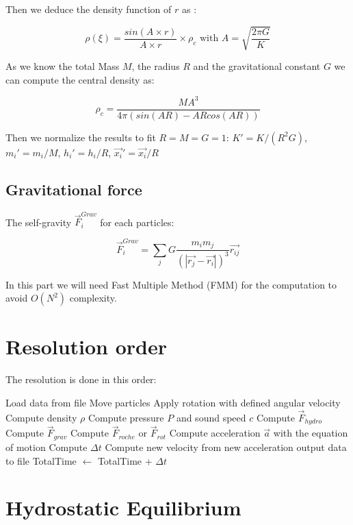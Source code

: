 \documentclass{article}
\begin{document}
Then we deduce the density function of $r$ as :

$$\rho(\xi) = \frac{sin(A\times r)}{A \times r} \times \rho_c \mbox{ with } A = \sqrt{\frac{2\pi G}{K}}
$$

As we know the total Mass $M$, the radius $R$ and the gravitational constant $G$ we can compute the central density as:

$$ \rho_c = \frac{M A^3}{4 \pi (sin(AR)-ARcos(AR)) } $$

Then we normalize the results to fit $R = M = G = 1$: $K' = K/(R^2G) $, $m_i' = m_i/M $, $h_i' = h_i / R$, $\vec{x_i}' = \vec{x_i}/R$


\subsection{Gravitational force}

The self-gravity $\vec{F}_i^{Grav}$ for each particles:

\begin{equation}
\vec{F}_i^{Grav} = \sum_j G\frac{m_im_j}{(|\vec{r_j}-\vec{r_i}|)^3} \vec{r_{ij}}
\end{equation}

In this part we will need Fast Multiple Method (FMM) for the computation to avoid $O(N^2)$ complexity.

\section{Resolution order}
\label{sec:reso}

The resolution is done in this order:\\

\begin{algorithmic}
\State Load data from file
\State Move particles
\State Apply rotation with defined angular velocity
\State Compute density $\rho$
\State Compute pressure $P$ and sound speed $c$
\State Compute $\vec{F}_{hydro}$
\State Compute $\vec{F}_{grav}$
\State Compute $\vec{F}_{roche}$ or $\vec{F}_{rot}$
\EndIf
\State Compute acceleration $\vec{a}$ with the equation of motion
\State Compute $\Delta t$
\State Compute new velocity from new acceleration
\State output data to file
\EndIf
\State TotalTime $\leftarrow$ TotalTime + $\Delta t$
\EndWhile
\end{algorithmic}

\section{Hydrostatic Equilibrium}
\label{sec:equi}
\end{document}
